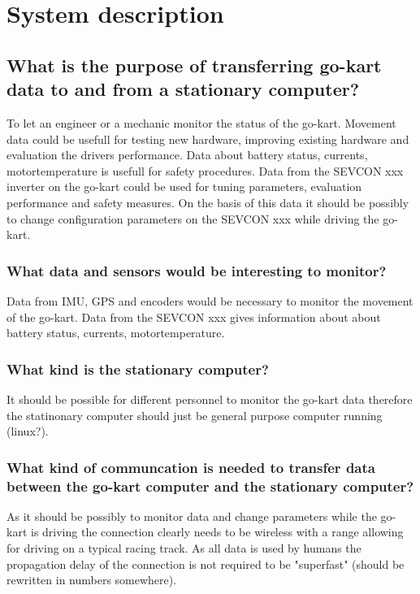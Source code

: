 
\section{System description}
\subsection{What is the purpose of transferring go-kart data to and from a stationary computer?}
To let an engineer or a mechanic monitor the status of the go-kart.
Movement data could be usefull for testing new hardware, improving existing hardware and evaluation the drivers performance. 
Data about battery status, currents, motortemperature is usefull for safety procedures.
Data from the SEVCON xxx inverter on the go-kart could be used for tuning parameters, evaluation performance and safety measures.
On the basis of this data it should be possibly to change configuration parameters on the SEVCON xxx while driving the go-kart.

\subsubsection{What data and sensors would be interesting to monitor?}
Data from IMU, GPS and encoders would be necessary to monitor the movement of the go-kart.
Data from the SEVCON xxx gives information about about battery status, currents, motortemperature.

\subsubsection{What kind is the stationary computer?}
It should be possible for different personnel to monitor the go-kart data therefore the statinonary computer should just be general purpose computer running (linux?).

\subsubsection{What kind of communcation is needed to transfer data between the go-kart computer and the stationary computer?}
As it should be possibly to monitor data and change parameters while the go-kart is driving the connection clearly needs to be wireless with a range allowing for driving on a typical racing track. 
As all data is used by humans the propagation delay of the connection is not required to be "superfast" (should be rewritten in numbers somewhere).

